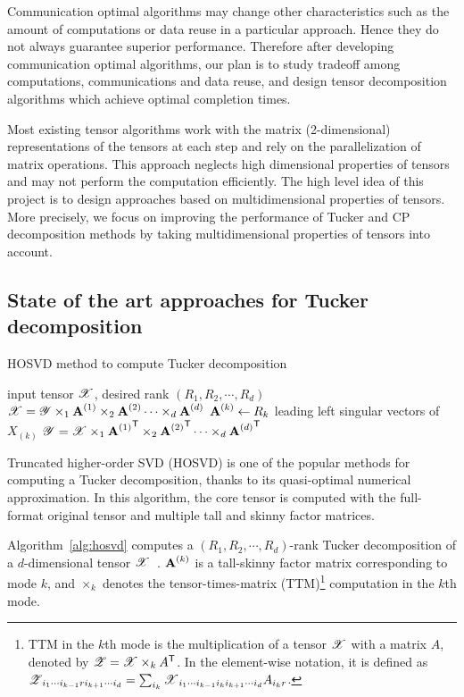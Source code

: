 \documentclass[a4paper,11pt]{article}
\newcommand{\X}{\T{X}}
\newcommand{\Y}{\T{Y}}
\newcommand{\Z}{\T{Z}}
\begin{document}
	
	Communication optimal algorithms may change other characteristics such as the amount of computations or data reuse in a particular approach. Hence they do not always guarantee superior performance. Therefore after developing communication optimal algorithms, our plan is to study tradeoff among computations, communications and data reuse, and design tensor decomposition algorithms which achieve optimal completion times.
	
	
	Most existing tensor algorithms work with the matrix (2-dimensional) representations of the tensors at each step and rely on the parallelization of matrix operations. This approach neglects high dimensional properties of tensors and may not perform the computation efficiently. The high level idea of this project is to design approaches based on multidimensional properties of tensors. More precisely, we focus on improving the performance of Tucker and CP decomposition methods by taking multidimensional properties of tensors into account.
	
	\subsection{State of the art approaches for Tucker decomposition}
	\label{sec:context:soa:Tucker}


	\begin{algorithm}[htb]{
			\caption{HOSVD method to compute Tucker decomposition\label{alg:hosvd}}
			\begin{algorithmic}[1]
				\Require input tensor $\X$, desired rank $(R_1, R_2,\cdots, R_d)$
				\Ensure  $\X = \Y \times_1 {\Mn{A}{1}}\times_2 {\Mn{A}{2}}\cdots \times_d {\Mn{A}{d}}$
				\State $\Mn{A}{k} \gets R_k$ leading left singular vectors of $X_{(k)}$\label{alg:hosvd:SVDs}
				\EndFor
				\State $\Y = \X \times_1 {\Mn{A}{1}}^\Tra \times_2 {\Mn{A}{2}}^\Tra \cdots\times_d {\Mn{A}{d}}^\Tra$\label{alg:hosvd:multiTTM}
			\end{algorithmic}
	}\end{algorithm}
	
	Truncated higher-order SVD (HOSVD) is one of the popular methods for computing a Tucker decomposition, thanks to its quasi-optimal numerical approximation. In this algorithm, the core tensor is computed with the full-format original tensor and multiple tall and skinny factor matrices.	
	

	
	Algorithm~\ref{alg:hosvd} computes a $(R_1, R_2, \cdots, R_d)$-rank Tucker decomposition of a $d$-dimensional tensor $\X$~\cite{KB-SIAM-2009}. $\Mn{A}{k}$ is a tall-skinny factor matrix corresponding to mode $k$, and $\times_k$ denotes the \linebreak tensor-times-matrix (TTM)\footnote{TTM in the $k$th mode is the multiplication of a tensor $\X$ with a matrix $A$, denoted by $\Z=\X \times_k A^\Tra$. In the element-wise notation, it is defined as $\Z_{i_1\cdots i_{k-1}ri_{k+1}\cdots i_d} = \sum_{i_k}\X_{i_1\cdots i_{k-1}i_ki_{k+1}\cdots i_d}A_{i_k r}$.} computation in the $k$th mode.
\end{document}
